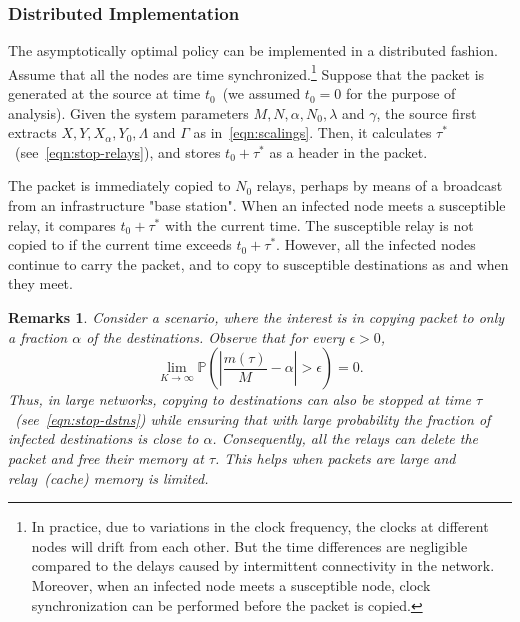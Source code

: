 \documentclass[10pt,journal,letterpaper]{IEEEtran}
\newtheorem{remarks}{Remarks}[section]
\newcommand{\remove}[1]{}
\begin{document}
\subsubsection*{Distributed Implementation}
The asymptotically optimal policy can be implemented
in a distributed fashion. Assume that all the nodes are time
synchronized.\footnote{In practice, due to variations in the clock
frequency, the clocks at different nodes will drift from each other.
But the time differences are negligible compared to the delays
caused by intermittent connectivity in the network. Moreover, when
an infected node meets a susceptible node, clock synchronization can
be performed before the packet is copied.} Suppose that the packet
is generated at the source at time $t_0$~(we assumed $t_0 = 0$ for
the purpose of analysis). Given the system parameters
$M,N,\alpha,N_0,\lambda$ and $\gamma$, the source first extracts
$X,Y,X_{\alpha},Y_0,\Lambda$ and $\Gamma$ as
in~\eqref{eqn:scalings}. Then, it calculates
$\tau^{\ast}$~(see~\eqref{eqn:stop-relays}), and stores  $t_0 +
\tau^{\ast}$ as a header in the packet. \remove{
\begin{enumerate}
\item the time at which copying to relays is stopped - this is set to $t_0 + \tau^{\ast}$.
\item the time at which copying to destinations is stopped - this is set to $t_0 + \tau$.
\end{enumerate}}

The packet is immediately copied to $N_0$ relays, perhaps by means of a
broadcast from an infrastructure "base station". When an infected
node meets a susceptible relay, it compares $t_0 + \tau^{\ast}$ with
the current time. The susceptible relay is not copied to if the
current time exceeds $t_0 + \tau^{\ast}$. However, all the infected
nodes continue to carry the packet, and to copy to susceptible
destinations as and when they meet.

\begin{remarks}
Consider a scenario, where the interest is in copying packet to only
a  fraction $\alpha$ of the destinations. Observe that for
every $\epsilon > 0$,
\begin{equation*}
\lim_{K \rightarrow \infty} \mathbb{P}\left(\left|\frac{m(\tau)}{M}
- \alpha\right| > \epsilon \right) = 0.
\end{equation*}
Thus, in large networks, copying to destinations can also be stopped at
time $\tau$~(see~\eqref{eqn:stop-dstns}) while ensuring that
with large probability the fraction of infected destinations is
close to $\alpha$. Consequently, all the relays can delete the
packet and free their memory at $\tau$.
This helps when packets are large and relay~(cache) memory is limited.
\end{remarks}
\end{document}
